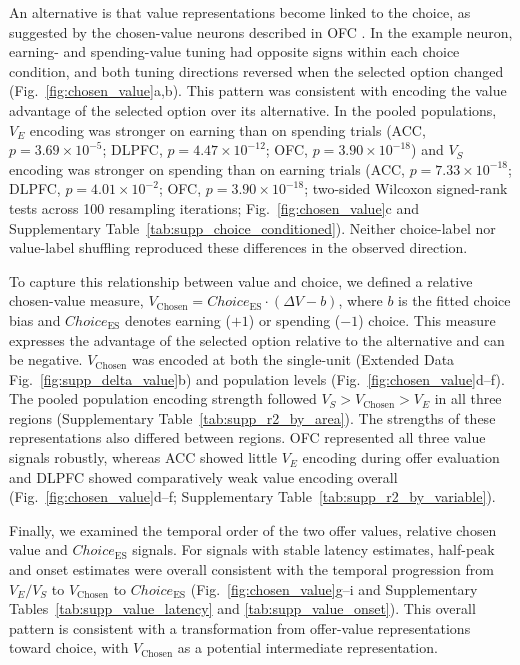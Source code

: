 \documentclass[pdflatex,sn-mathphys-num]{sn-jnl}%
\begin{document}
An alternative is that value representations become linked to the choice, as suggested by the chosen-value neurons described in OFC \citep{padoa-schioppaNeuronsOrbitofrontalCortex2006b}. In the example neuron, earning- and spending-value tuning had opposite signs within each choice condition, and both tuning directions reversed when the selected option changed (Fig.~\ref{fig:chosen_value}a,b). This pattern was consistent with encoding the value advantage of the selected option over its alternative. In the pooled populations, $V_E$ encoding was stronger on earning than on spending trials (ACC, $p=3.69\times10^{-5}$; DLPFC, $p=4.47\times10^{-12}$; OFC, $p=3.90\times10^{-18}$) and $V_S$ encoding was stronger on spending than on earning trials (ACC, $p=7.33\times10^{-18}$; DLPFC, $p=4.01\times10^{-2}$; OFC, $p=3.90\times10^{-18}$; two-sided Wilcoxon signed-rank tests across 100 resampling iterations; Fig.~\ref{fig:chosen_value}c and Supplementary Table~\ref{tab:supp_choice_conditioned}). Neither choice-label nor value-label shuffling reproduced these differences in the observed direction.

To capture this relationship between value and choice, we defined a relative chosen-value measure, $V_{\mathrm{Chosen}}=\mathit{Choice}_{\mathrm{ES}}\cdot(\Delta V-b)$, where $b$ is the fitted choice bias and $\mathit{Choice}_{\mathrm{ES}}$ denotes earning ($+1$) or spending ($-1$) choice. This measure expresses the advantage of the selected option relative to the alternative and can be negative. $V_{\mathrm{Chosen}}$ was encoded at both the single-unit (Extended Data Fig.~\ref{fig:supp_delta_value}b) and population levels (Fig.~\ref{fig:chosen_value}d--f). The pooled population encoding strength followed $V_S>V_{\mathrm{Chosen}}>V_E$ in all three regions (Supplementary Table~\ref{tab:supp_r2_by_area}). The strengths of these representations also differed between regions. OFC represented all three value signals robustly, whereas ACC showed little $V_E$ encoding during offer evaluation and DLPFC showed comparatively weak value encoding overall (Fig.~\ref{fig:chosen_value}d--f; Supplementary Table~\ref{tab:supp_r2_by_variable}).

Finally, we examined the temporal order of the two offer values, relative chosen value and $\mathit{Choice}_{\mathrm{ES}}$ signals. For signals with stable latency estimates, half-peak and onset estimates were overall consistent with the temporal progression from $V_E/V_S$ to $V_{\mathrm{Chosen}}$ to $\mathit{Choice}_{\mathrm{ES}}$ (Fig.~\ref{fig:chosen_value}g--i and Supplementary Tables~\ref{tab:supp_value_latency} and \ref{tab:supp_value_onset}). This overall pattern is consistent with a transformation from offer-value representations toward choice, with $V_{\mathrm{Chosen}}$ as a potential intermediate representation.
\end{document}
